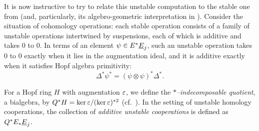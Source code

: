 It is now instructive to try to relate this unstable computation to the stable one from  (and, particularly, its algebro-geometric interpretation in ).
Consider the situation of cohomology operations: each stable operation consists of a family of unstable operations intertwined by suspensions, each of which is additive and takes \(0\) to \(0\).
In terms of an element \(\psi \in E^* \OS{E}{j}\), such an unstable operation takes \(0\) to \(0\) exactly when it lies in the augmentation ideal, and it is additive exactly when it satisfies Hopf algebra primitivity: \[\Delta^* \psi^* = (\psi \otimes \psi)^* \Delta^*.\]
\begin{definition}
For a Hopf ring \(H\) with augmentation \(\varepsilon\), we define the \textit{\(\ast\)--indecomposable quotient}, a bialgebra, by \(Q^* H = \ker \varepsilon / (\ker \varepsilon)^{\ast 2}\) (cf.\ ).
In the setting of unstable homology cooperations, the collection of \textit{additive unstable cooperations} is defined as \(Q^* E_* \OS{E}{j}\).
\end{definition}

